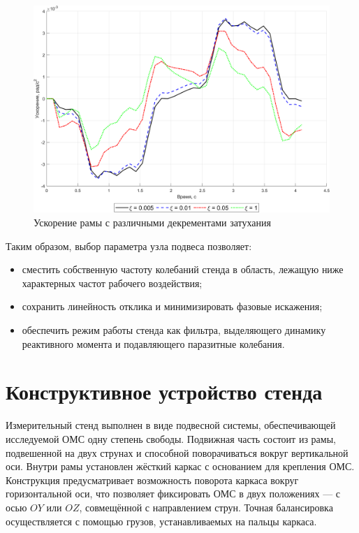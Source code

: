 \begin{figure}[!h]
	\centering
	\includegraphics[scale=0.7]{matlab/decrement.png}
	\caption{Ускорение рамы с различными декрементами затухания}
	\label{fig:decrement}
\end{figure}

Таким образом, выбор параметра узла подвеса позволяет:

\begin{itemize}
	\item сместить собственную частоту колебаний стенда в область, лежащую ниже характерных частот рабочего воздействия;
	\item сохранить линейность отклика и минимизировать фазовые искажения;
	\item обеспечить режим работы стенда как фильтра, выделяющего динамику реактивного момента и подавляющего паразитные колебания.
\end{itemize}

\section{Конструктивное устройство стенда}

Измерительный стенд выполнен в виде подвесной системы, обеспечивающей исследуемой ОМС одну степень свободы. Подвижная часть состоит из рамы, подвешенной на двух струнах и способной поворачиваться вокруг вертикальной оси. Внутри рамы установлен жёсткий каркас с основанием для крепления ОМС. Конструкция предусматривает возможность поворота каркаса вокруг горизонтальной оси, что позволяет фиксировать ОМС в двух положениях — с осью $OY$ или $OZ$, совмещённой с направлением струн. Точная балансировка осуществляется с помощью грузов, устанавливаемых на пальцы каркаса.

